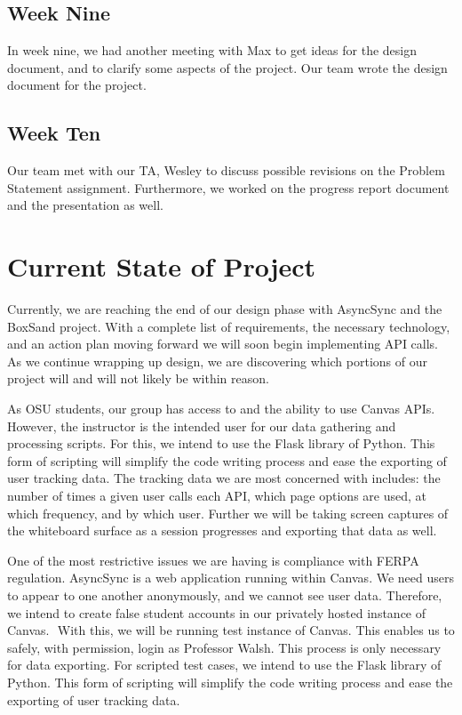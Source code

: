 \documentclass[onecolumn, draftclsnofoot,10pt, compsoc]{IEEEtran}
\begin{document}
\subsection{Week Nine}
In week nine, we had another meeting with Max to get ideas for the design document, and to clarify some aspects of the project. Our team wrote the design document for the project.
\subsection{Week Ten}
Our team met with our TA, Wesley to discuss possible revisions on the Problem Statement assignment. Furthermore, we worked on the progress report document and the presentation as well.

\section{Current State of Project}
Currently, we are reaching the end of our design phase with AsyncSync and the BoxSand project. With a complete list of requirements, the necessary technology, and an action plan moving forward we will soon begin implementing API calls. As we continue wrapping up design, we are discovering which portions of our project will and will not likely be within reason.

As OSU students, our group has access to and the ability to use Canvas APIs. However, the instructor is the intended user for our data gathering and processing scripts. For this, we intend to use the Flask library of Python. This form of scripting will simplify the code writing process and ease the exporting of user tracking data. The tracking data we are most concerned with includes: the number of times a given user calls each API, which page options are used, at which frequency, and by which user. Further we will be taking screen captures of the whiteboard surface as a session progresses and exporting that data as well.

One of the most restrictive issues we are having is compliance with FERPA regulation. AsyncSync is a web application running within Canvas. We need users to appear to one another anonymously, and we cannot see user data. Therefore, we intend to create false student accounts in our privately hosted instance of Canvas. ­ With this, we will be running test instance of Canvas. This enables us to safely, with permission, login as Professor Walsh. This process is only necessary for data exporting. For scripted test cases, we intend to use the Flask library of Python. This form of scripting will simplify the code writing process and ease the exporting of user tracking data.
\end{document}
